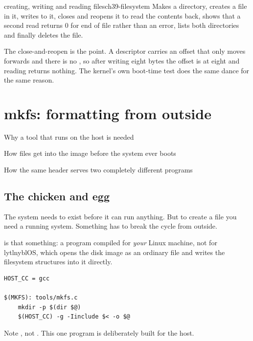 \begin{recipe}{creating, writing and reading files}{ch39-filesystem}
Makes a directory, creates a file in it, writes to it, closes and reopens it to read the contents
back, shows that a second read returns 0 for end of file rather than an error, lists both
directories and finally deletes the file.

The close-and-reopen is the point. A descriptor carries an offset that only moves forwards and
there is no , so after writing eight bytes the offset is at eight and reading returns
nothing. The kernel's own boot-time test does the same dance for the same reason.
\end{recipe}

\chapter{mkfs: formatting from outside}

\begin{goals}
  \item Why a tool that runs on the host is needed
  \item How files get into the image before the system ever boots
  \item How the same header serves two completely different programs
\end{goals}

\section{The chicken and egg}

The system needs  to exist before it can run anything. But to create a file you need
a running system. Something has to break the cycle from outside.

 is that something: a program compiled for \emph{your} Linux machine, not for lytlnyblOS,
which opens the disk image as an ordinary file and writes the filesystem structures into it
directly.

\begin{lstlisting}[style=mk]
HOST_CC = gcc

$(MKFS): tools/mkfs.c
	mkdir -p $(dir $@)
	$(HOST_CC) -g -Iinclude $< -o $@
\end{lstlisting}

Note , not . This one program is deliberately built for the
host.

